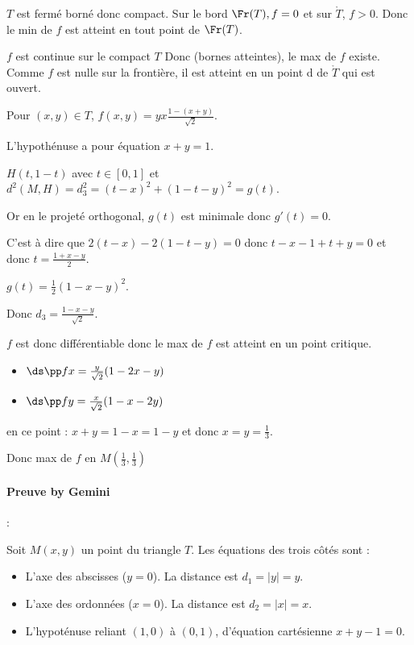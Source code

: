 \begin{exemple}
    $T$ est fermé borné donc compact. Sur le bord $\Fr(T), f= 0$ et sur $\mathring T$, $f > 0$. 
    Donc le min de $f$ est atteint en tout point de $\Fr(T)$. 

    $f$ est continue sur le compact $T$ Donc (bornes atteintes), le max de $f$ 
    existe. Comme $f$ est nulle sur la frontière, il est atteint en un point 
    d de $\mathring T$ qui est ouvert. 

    Pour $(x, y) \in T$, $f(x, y) = y x \frac{1 - (x + y)}{\sqrt 2}$. 

    L'hypothénuse a pour équation $x + y = 1$.

    $H(t, 1 - t)$ avec $t \in [0, 1]$ et $d^2(M, H) = d_3^2 = (t - x)^2 + (1 - t - y)^2 = g(t)$.
    
    Or en le projeté orthogonal, $g(t)$ est minimale donc $g'(t) = 0$.

    C'est à dire que $2 (t - x) - 2(1 - t - y) = 0$ donc 
    $t - x - 1 + t+ y = 0$ et donc $t = \frac{1 + x - y}{2}$.

    $g(t) = \frac 1 2 (1 - x - y)^2$. 

    Donc $d_3 = \frac{ 1 - x - y}{\sqrt 2 }$. 

    $f$ est donc différentiable donc le max de $f$ est atteint en un point critique. 

    \begin{itemize}
        \item $\ds \pp f x = \frac{y}{\sqrt 2} (1 - 2x - y)$
        \item $\ds \pp f y = \frac{x}{\sqrt 2} (1 - x - 2y)$
    \end{itemize}

    en ce point : $x + y = 1 -x = 1 - y$ et donc $x = y = \frac 1 3$.

    Donc max de $f$ en $M\left( \frac 1 3, \frac 1 3 \right)$

    \lvspace \paragraph*{Preuve by Gemini} :


    \svspace Soit $M(x,y)$ un point du triangle $T$. Les équations des trois côtés sont :
    \begin{itemize}
        \item L'axe des abscisses ($y=0$). La distance est $d_1 = |y| = y$.
        \item L'axe des ordonnées ($x=0$). La distance est $d_2 = |x| = x$.
        \item L'hypoténuse reliant $(1,0)$ à $(0,1)$, d'équation cartésienne $x+y-1=0$.
    \end{itemize}


\end{exemple}
